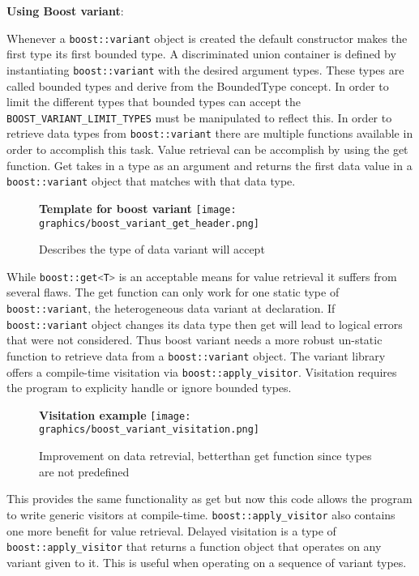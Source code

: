 \documentclass[letterpaper, 12pt]{article}
\newcommand{\inlinecode}[1]{\colorbox{codegrey}{\lstinline[language=C++]{#1}}}
\begin{document}
{\bfseries Using Boost variant}:
\par\vspace{\baselineskip}
Whenever a \inlinecode{boost::variant} object is created the default constructor makes the first type its first bounded type.
A discriminated union container is defined by instantiating \inlinecode{boost::variant} with the desired argument types.
These types are called bounded types and derive from the BoundedType concept. In order to limit the different
types that bounded types can accept the \inlinecode{BOOST_VARIANT_LIMIT_TYPES} must be manipulated to reflect this.
In order to retrieve data types from \inlinecode{boost::variant} there are multiple functions available in order to accomplish this task.
Value retrieval can be accomplish by using the get function. Get takes in a type as an argument and returns the first
data value in a \inlinecode{boost::variant} object that matches with that data type.
\par\vspace{\baselineskip}
\begin{figure}
  \centering
  \textbf{Template for boost variant}
  \texttt{[image: graphics/boost\_variant\_get\_header.png]}
  \cite{boostvariant}
  \caption{Describes the type of data variant will accept}
\end{figure}

While \inlinecode{boost::get<T>} is an acceptable means for value retrieval it suffers from several flaws.
The get function can only work for one static type of \inlinecode{boost::variant},
the heterogeneous data variant at declaration. If \inlinecode{boost::variant} object
changes its data type then get will lead to logical errors that were not considered.
Thus boost variant needs a more robust un-static function to retrieve
data from a \inlinecode{boost::variant} object. The variant library offers a compile-time visitation
via \inlinecode{boost::apply_visitor}. Visitation requires the program to explicity handle or ignore bounded types.
\par\vspace{\baselineskip}

\begin{figure}
  \centering
  \textbf{Visitation example}
  \texttt{[image: graphics/boost\_variant\_visitation.png]}
  \cite{boostvariant}
  \caption{Improvement on data retrevial, betterthan get function since types are not predefined}
\end{figure}

This provides the same functionality as get but now this code allows the program to write
generic visitors at compile-time. \inlinecode{boost::apply_visitor} also contains one more benefit for
value retrieval. Delayed visitation is a type of \inlinecode{boost::apply_visitor} that returns
a function object that operates on any variant given to it. This is useful when operating on a sequence of
variant types.
\par\vspace{\baselineskip}
\end{document}
